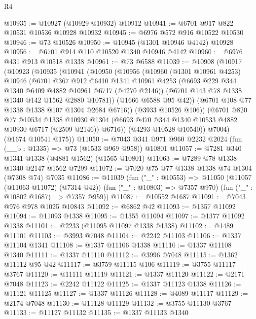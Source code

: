 \begin{lexlean}{R4}
\begin{coremodule}
@10935 := @10927 (@10929 @10932) @10912
@10941 := @6701 @917 @822 @10531 @10536 @10928 @10932
@10945 := @6976 @572 @916 @10522 @10530
@10946 := @73 @10526
@10950 := @10945 (@1301 @10946 @4142) @10928
@10956 := @6701 @914 @110 @10520 @1340 @10946 @4142
@10960 := @6976 @431 @913 @10518 @1338
@10961 := @73 @6588
@11039 := @10908
    (@10917
      (@10923
        (@10935
          (@10941
            (@10950
              (@10956
                (@10960
                  (@1301 @10961 @4253)
                  @10946
                  (@6701
                    @367
                    @912
                    @6410
                    @1341
                    @10961
                    @4253
                    (@6693 @229 @344 @1340 @6409 @4882 @10961 @6717 (@4270 @2146))
                    (@6701 @143 @78 @1338 @1340 @142 @1562 @2880 @10781))
                  (@1666 @6588 @95 @42))
                (@6701 @108 @77 @1338 @1338 @107 @1304 @2684 @6716))
              (@3933 @10526 @106))
            (@6701
              @820
              @77
              @10534
              @1338
              @10930
              @1304
              (@6693 @470 @344 @1340 @10533 @4882 @10930 @6717 (@2509 @2146))
              @6716))
          (@4293 @10528 @10540))
        @7004)
      (@1674 @10541 @175))
@11050 := @7043 @341 @971 @960 @2232 @2024 (fun (__b : @1335) => @73 (@1533 @969 @958)) @10801
@11057 := @7281 @340 @1341 @1338 (@4881 @1562) (@1565 @10801)
@11063 := @7289 @78 @1338 @1340 @2147 @1562 @7299
@11072 := @7020 @75 @77 @1338 @1338 @74 @1304 (@7308 @74) @7035
@11086 := @11039
    (fun ("_" : @10553) =>
    @11050
      (@11057 (@11063 @11072) (@7314 @42))
      (fun ("_" : @10803) => @7357 @970)
      (fun ("_" : @10802 @1687) => @7357 @959))
@11087 := @10552 @1687
@11091 := @7043 @976 @978 @1025 @10843
@11092 := @6862 @42
@11093 := @1357 @11092
@11094 := @11093 @1338
@11095 := @1355 @11094
@11097 := @1377 @11092 @1338
@11101 := @2233 (@11095 @11097 @1338 @1338)
@11102 := @1489 @11101
@11103 := @3993 @7048
@11104 := @2242 @11103
@11106 := @1337 @11104 @1341
@11108 := @1337 @11106 @1338
@11110 := @1337 @11108 @1340
@11111 := @1337 @11110
@11112 := @3996 @7048
@11115 := @1362 @11112 @95 @42
@11117 := @3759 @11115 @106
@11119 := @3755 @11117 @3767
@11120 := @11111 @11119
@11121 := @1337 @11120
@11122 := @2171 @7048
@11123 := @2242 @11122
@11125 := @1337 @11123 @1338
@11126 := @11121 @11125
@11127 := @1337 @11126
@11128 := @4089 @11117
@11129 := @2174 @7048
@11130 := @11128 @11129
@11132 := @3755 @11130 @3767
@11133 := @11127 @11132
@11135 := @1337 @11133 @1340

\end{coremodule}
\end{lexlean}
